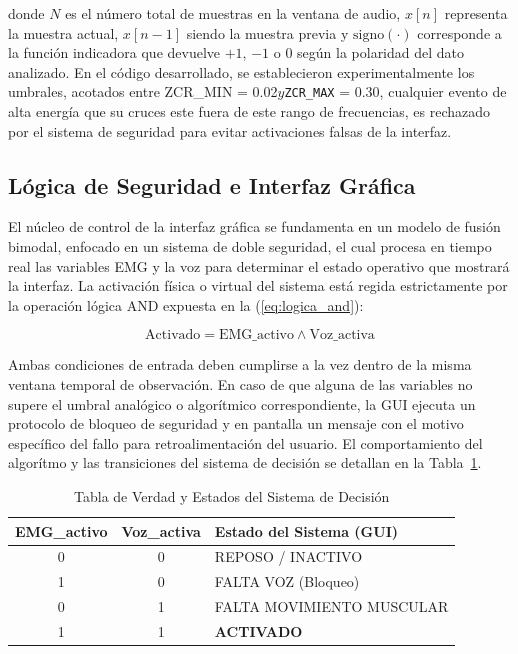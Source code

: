 \documentclass[conference]{IEEEtran}
\begin{document}
donde $N$ es el n\'umero total de muestras en la ventana de audio, $x[n]$ representa la muestra actual, $x[n-1]$ siendo la muestra previa y $\text{signo}(\cdot)$ corresponde a la funci\'on indicadora que devuelve $+1$, $-1$ o $0$ seg\'un la polaridad del dato analizado. En el c\'odigo desarrollado, se establecieron experimentalmente los umbrales, acotados entre ZCR\_MIN = 0.02$ y $\texttt{ZCR\_MAX} = 0.30, cualquier evento de alta energ\'ia que su cruces este fuera de este rango de frecuencias, es rechazado por el sistema de seguridad para evitar activaciones falsas de la interfaz.

\subsection{L\'ogica de Seguridad e Interfaz Gr\'afica}
El núcleo de control de la interfaz gr\'afica se fundamenta en un modelo de fusi\'on bimodal, enfocado en un sistema de doble seguridad, el cual procesa en tiempo real las variables EMG y la voz para determinar el estado operativo que mostrar\'a la interfaz. La activaci\'on f\'isica o virtual del sistema est\'a regida estrictamente por la operaci\'on l\'ogica AND expuesta en la (\ref{eq:logica_and}):

\begin{equation}
\text{Activado} = \text{EMG\_activo} \land \text{Voz\_activa}
\label{eq:logica_and}
\end{equation}

Ambas condiciones de entrada deben cumplirse a la vez dentro de la misma ventana temporal de observaci\'on. En caso de que alguna de las variables no supere el umbral anal\'ogico o algor\'itmico correspondiente, la GUI ejecuta un protocolo de bloqueo de seguridad y en pantalla un mensaje con el motivo espec\'ifico del fallo para retroalimentaci\'on del usuario. El comportamiento del algor\'itmo y las transiciones del sistema de decisi\'on se detallan en la Tabla~\ref{tab:tabla_verdad}.

\begin{table}[htbp]
\caption{Tabla de Verdad y Estados del Sistema de Decisi\'on}
\begin{center}
\begin{tabular}{|c|c|l|}
\hline
\textbf{EMG\_activo} & \textbf{Voz\_activa} & \textbf{Estado del Sistema (GUI)} \\ \hline
0                    & 0                    & REPOSO / INACTIVO                 \\ \hline
1                    & 0                    & FALTA VOZ (Bloqueo)               \\ \hline
0                    & 1                    & FALTA MOVIMIENTO MUSCULAR\\ 
\hline
1                    & 1                    & \textbf{ACTIVADO}                 \\ \hline
\end{tabular}
\label{tab:tabla_verdad}
\end{center}
\end{table}
\end{document}
